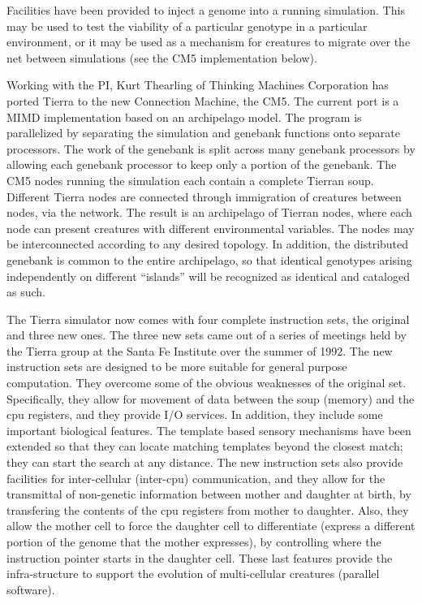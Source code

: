 Facilities have been provided to inject a genome into a running simulation.
This may be used to test the viability of a particular genotype in a particular
environment, or it may be used as a mechanism for creatures to migrate over
the net between simulations (see the CM5 implementation below).

Working with the PI, Kurt Thearling of Thinking Machines Corporation has
ported Tierra to the new Connection Machine, the CM5.  The current port
is a MIMD implementation based on an archipelago model.  The program is
parallelized by separating the simulation and genebank functions onto separate
processors.  The work of the genebank is split across many genebank processors
by allowing each genebank processor to keep only a portion of the genebank.
The CM5 nodes running the simulation each contain a complete Tierran soup.
Different Tierra nodes are connected through immigration of creatures between
nodes, via the network.  The result is an archipelago of Tierran nodes, where
each node can present creatures with different environmental variables.  The
nodes may be interconnected according to any desired topology.  In addition,
the distributed genebank is common to the entire archipelago, so that
identical genotypes arising independently on different ``islands'' will be
recognized as identical and cataloged as such. 

The Tierra simulator now comes with four complete instruction sets, the
original and three new ones.  The three new sets came out of a series
of meetings held by the Tierra group at the Santa Fe Institute over the
summer of 1992.  The new instruction sets are designed to be more suitable for
general purpose computation.  They overcome some of the obvious weaknesses of
the original set.  Specifically, they allow for movement of data between the
soup (memory) and the cpu registers, and they provide I/O services.  In
addition, they include some important biological features.  The template based
sensory mechanisms have been extended so that they can locate matching
templates beyond the closest match; they can start the search at any distance.
The new instruction sets also provide facilities for inter-cellular
(inter-cpu) communication, and they allow for the transmittal of non-genetic
information between mother and daughter at birth, by transfering the contents
of the cpu registers from mother to daughter.  Also, they allow the mother cell
to force the daughter cell to differentiate (express a different portion of
the genome that the mother expresses), by controlling where the instruction
pointer starts in the daughter cell.  These last features provide the
infra-structure to support the evolution of multi-cellular creatures (parallel
software).

